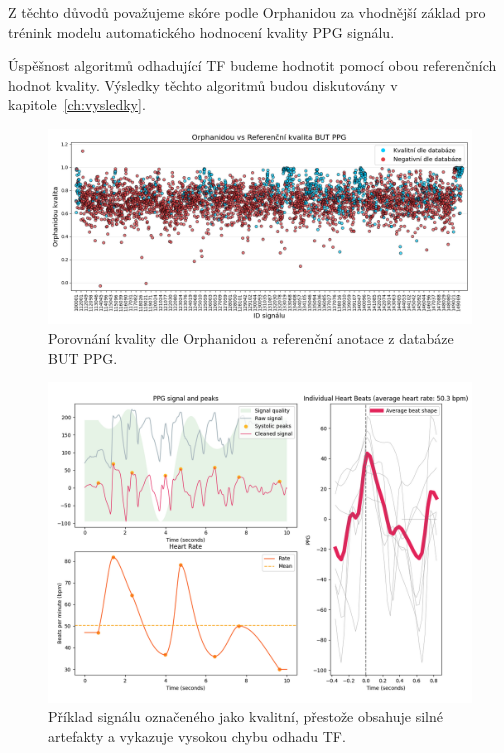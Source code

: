 Z těchto důvodů považujeme skóre podle Orphanidou za vhodnější základ pro trénink modelu automatického hodnocení kvality PPG signálu.

Úspěšnost algoritmů odhadující \acs{TF} budeme hodnotit pomocí obou referenčních hodnot kvality.
Výsledky těchto algoritmů budou diskutovány v kapitole~\ref{ch:vysledky}.

\begin{figure}[ht]
	\centering
	\includegraphics[width=1\textwidth]{./obrazky/quality/Orphanidou_Ref_Q.png}
	\caption[Porovnání kvality dle Orphanidou a referenční anotace z databáze \acs{BUT PPG}]{Porovnání kvality dle Orphanidou a referenční anotace z databáze \acs{BUT PPG}.}
	\label{fig:orphanidou_mismatch}
\end{figure}

\begin{figure}[ht]
	\centering
	\includegraphics[width=1\textwidth]{./obrazky/quality/good_but_not_good.png}
	\caption[Signál označený databází za kvalitní]{Příklad signálu označeného jako kvalitní, přestože obsahuje silné artefakty a vykazuje vysokou chybu odhadu \acs{TF}.}
	\label{fig:bad_quality_passed}
\end{figure}
